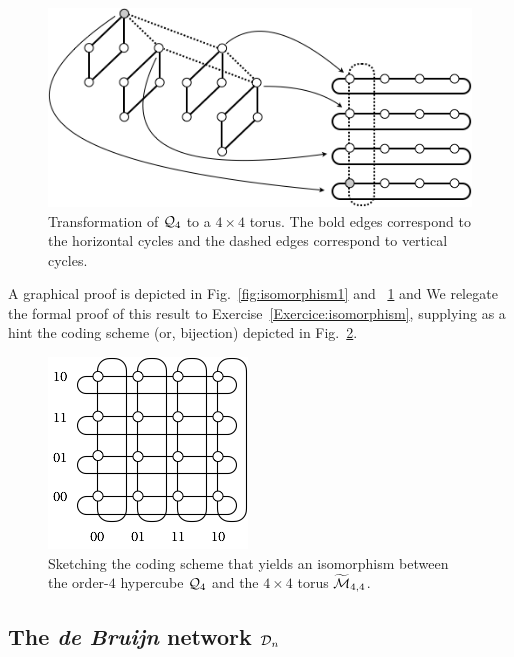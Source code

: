\begin{figure}[hbt]
\begin{center}
       \includegraphics[scale=0.5]{FiguresGraph/Isomorphism2}
       \caption{Transformation of $\mbox{$\cal Q$}_4$ to a $4 \times 4$ torus.
       The bold edges correspond to the horizontal cycles and the dashed edges correspond to vertical cycles.}
  \label{fig:isomorphism2}
\end{center}
\end{figure}

A graphical proof is depicted in Fig.~\ref{fig:isomorphism1}  and ~\ref{fig:isomorphism2} and 
We relegate the formal proof of this result to Exercise~\ref{Exercice:isomorphism},
supplying as a
hint the coding scheme (or, bijection) depicted in
Fig.~\ref{fig:toruslabel}.
\begin{figure}[hbt]
\begin{center}
       \includegraphics[scale=0.6]{FiguresGraph/toruslabel}
\caption{Sketching the coding scheme that yields an isomorphism
  between the order-$4$ hypercube $\mbox{$\cal Q$}_4$ and the $4 \times                          
4$ torus $\widetilde{\mbox{$\cal M$}}_{4,4}$.}
  \label{fig:toruslabel}
\end{center}
\end{figure}


\subsection{The {\it de Bruijn} network $\mbox{$\cal D$}_n$}
\label{sec:deBruijn}

